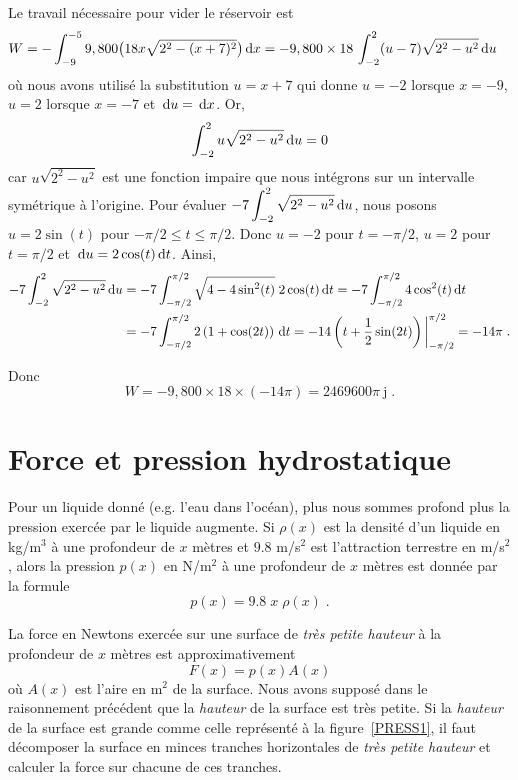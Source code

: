 {\begin{egg}
Le travail nécessaire pour vider le réservoir est
\begin{align*}
W & = - \int_{-9}^{-5} 9,800\big( 18 x \sqrt{2^2-(x+7)^2} \big) \,\mathrm{d}x
= - 9,800\times 18 \, \int_{-2}^{2} (u-7) \sqrt{2^2-u^2} \,\mathrm{d}u
\end{align*}
où nous avons utilisé la substitution $u=x+7$ qui donne $u=-2$ lorsque $x=-9$,
$u=2$ lorsque $x=-7$ et $\,\mathrm{d}u=\,\mathrm{d}x$.  Or,
\[
\int_{-2}^{2} u \sqrt{2^2-u^2} \,\mathrm{d}u = 0
\]
car $u \sqrt{2^2-u^2}$ est une fonction impaire que nous intégrons sur un
intervalle symétrique à l'origine.  Pour évaluer
$\displaystyle -7 \int_{-2}^{2} \sqrt{2^2-u^2} \,\mathrm{d}u$, nous posons
$u = 2\sin(t)$ pour $-\pi/2 \leq t \leq \pi/2$.  Donc $u = -2$ pour
$t = -\pi/2$, $u=2$ pour $t = \pi/2$ et $\,\mathrm{d}u = 2\cos(t) \,\mathrm{d}t$.
Ainsi,
\begin{align*}
-7 \int_{-2}^{2} \sqrt{2^2-u^2} \,\mathrm{d}u &=
-7 \int_{-\pi/2}^{\pi/2} \sqrt{4-4\sin^2(t)} \; 2\cos(t)\,\mathrm{d}t
= -7 \int_{-\pi/2}^{\pi/2} 4\cos^2(t)\,\mathrm{d}t \\
&= -7 \int_{-\pi/2}^{\pi/2} 2\left( 1+\cos(2t)\right) \,\mathrm{d}t
= -14 \left( t+ \frac{1}{2}\sin(2t)\right)\bigg|_{-\pi/2}^{\pi/2} 
= -14 \pi \; .
\end{align*}

Donc
\[
W  = - 9,800\times 18 \times (-14 \pi) = 2469600 \pi \ \text{j} \; .
\]
\end{egg}


\section{Force et pression hydrostatique \eng}

Pour un liquide donné (e.g. l'eau dans l'océan), plus nous sommes
profond plus la pression exercée par le liquide augmente.  Si
$\rho(x)$ est la densité d'un
liquide en kg/m$^3$ à une profondeur de $x$ mètres et $9.8$ m/s$^2$
est l'attraction terrestre en m/s$^2$, alors la pression $p(x)$ en
N/m$^2$ à une profondeur de $x$ mètres est donnée par la formule
\[
p(x) =  9.8 \; x \; \rho(x) \; .
\]

La force en Newtons exercée sur une surface de {\it très petite hauteur} à
la profondeur de $x$ mètres est approximativement
\[
F(x) = p(x) A(x)
\]
où $A(x)$ est l'aire en m$^2$ de la surface.  Nous avons supposé dans le
raisonnement précédent que la {\it hauteur} de la surface est très
petite.  Si la {\it hauteur} de la surface est grande comme celle
représenté à la figure~\ref{PRESS1},  il faut décomposer la surface en
minces tranches horizontales de {\it très petite hauteur} et calculer
la force sur chacune de ces tranches.

}
